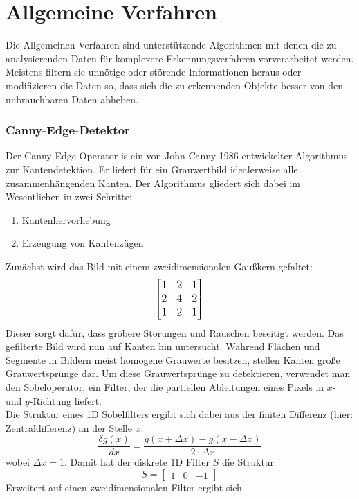 
\chapter{Allgemeine Verfahren}
\label{chap:k3}
Die Allgemeinen Verfahren sind unterstützende Algorithmen mit denen die zu analysierenden Daten für komplexere Erkennungsverfahren vorverarbeitet werden. Meistens filtern sie unnötige oder störende Informationen heraus oder modifizieren die Daten so, dass sich die zu erkennenden Objekte besser von den unbrauchbaren Daten abheben.
	\subsection {Canny-Edge-Detektor}

		Der Canny-Edge Operator \cite{Canny1986} is ein von John Canny 1986 entwickelter Algorithmus zur Kantendetektion. Er liefert für ein Grauwertbild idealerweise alle zusammenhängenden Kanten. Der Algorithmus gliedert sich dabei im Wesentlichen in zwei Schritte:
\begin{enumerate}
	\item Kantenhervorhebung
	\item Erzeugung von Kantenzügen
\end{enumerate}

Zunächst wird das Bild mit einem zweidimensionalen Gaußkern gefaltet:
{\[\large \begin{bmatrix}
1 & 2 & 1\\ 
2 & 4 & 2 \\ 
1 & 2 & 1
\end{bmatrix}\]}
Dieser sorgt dafür, dass gröbere Störungen und Rauschen beseitigt werden.
Das gefilterte Bild wird nun auf Kanten hin untersucht. Während Flächen und Segmente in Bildern meist homogene Grauwerte besitzen, stellen Kanten große Grauwertsprünge dar. Um diese Grauwertsprünge zu detektieren, verwendet man den Sobeloperator, ein Filter, der die partiellen Ableitungen eines Pixels in $x$- und $y$-Richtung liefert. \\
Die Struktur eines 1D Sobelfilters ergibt sich dabei aus der finiten Differenz (hier: Zentraldifferenz) an der Stelle $x$:
\begin{equation*}
\frac{\delta g(x)}{dx} = \frac{g(x + \Delta x) - g(x - \Delta x)}{2 \cdot \Delta x }
\end{equation*}
wobei $\Delta x = 1$. Damit hat der diskrete 1D Filter $S$ die Struktur
\begin{equation*}
S = \begin{bmatrix}
1 & 0 & -1
\end{bmatrix}
\end{equation*}
Erweitert auf einen zweidimensionalen Filter ergibt sich

